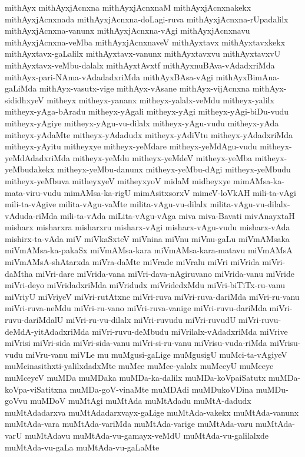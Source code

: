 {mithAyx
mithAyxjAcnxna
mithAyxjAcnxnaM
mithAyxjAcnxnakekx
mithAyxjAcnxnada
mithAyxjAcnxna-doLagi-ruva
mithAyxjAcnxna-rUpadalilx
mithAyxjAcnxna-vanunx
mithAyxjAcnxna-vAgi
mithAyxjAcnxnavu
mithAyxjAcnxna-veMba
mithAyxjAcnxnaveV
mithAyxtavx
mithAyxtavxkekx
mithAyxtavx-gaLalilx
mithAyxtavx-vanunx
mithAyxtavxvu
mithAyxtavxvU
mithAyxtavx-veMbu-dalalx
mithAyxtAvxtf
mithAyxnuBAva-vAdadxriMda
mithAyx-pari-NAma-vAdadadxriMda
mithAyxBAsa-vAgi
mithAyxBimAna-gaLiMda
mithAyx-vasutx-vige
mithAyx-vAsane
mithAyx-vijAcnxna
mithAyx-sididhxyeV
mitheyx
mitheyx-yananx
mitheyx-yalalx-veMdu
mitheyx-yalilx
mitheyx-yAga-bAradu
mitheyx-yAgali
mitheyx-yAgi
mitheyx-yAgi-biDu-vudu
mitheyx-yAgiye
mitheyx-yAgu-vu-dilalx
mitheyx-yAgu-vudu
mitheyx-yAda
mitheyx-yAdaMte
mitheyx-yAdadudx
mitheyx-yAdiVtu
mitheyx-yAdadxriMda
mitheyx-yAyitu
mitheyxye
mitheyx-yeMdare
mitheyx-yeMdAgu-vudu
mitheyx-yeMdAdadxriMda
mitheyx-yeMdu
mitheyx-yeMdeV
mitheyx-yeMba
mitheyx-yeMbudakekx
mitheyx-yeMbu-danunx
mitheyx-yeMbu-dAgi
mitheyx-yeMbudu
mitheyx-yeMbuva
mitheyxyeV
mitheyxyoV
midaM
midheyxye
mimAMsa-ka-mata-viru-vudu
mimAMsa-ka-rigU
mimAsitxsorxV
mimeV-loVkAH
mili-ta-vAgi
mili-ta-vAgive
milita-vAgu-vaMte
milita-vAgu-vu-dilalx
milita-vAgu-vu-dilalx-vAduda-riMda
mili-ta-vAda
miLita-vAgu-vAga
miva
miva-Bavati
mivAnayxtaH
misharx
misharxra
misharxru
misharx-vAgi
misharx-vAgu-vudu
misharx-vAda
mishirx-ta-vAda
miV
miVkaSxteV
miVnina
miVnu
miVnu-gaLu
miVmAMsaka
miVmAMsa-ka-pakaSx
miVmAMsa-kara
miVmAMsa-kara-matavu
miVmAMsA
miVmAMsA-shAtarxda
miVra-daMte
miVrade
miVralu
miVri
miVrida
miVri-daMtha
miVri-dare
miVrida-vana
miVri-dava-nAgiruvano
miVrida-vanu
miVride
miVri-deyo
miVridadxriMda
miVridudx
miVridedxMdu
miVri-biTiTx-ru-vanu
miVriyU
miVriyeV
miVri-rutAtxne
miVri-ruva
miVri-ruva-dariMda
miVri-ru-vanu
miVri-ruva-neMdu
miVri-ru-vano
miVri-ruva-vanige
miVri-ruvu-dariMda
miVri-ruvu-dariMdalU
miVri-ru-vu-dilalx
miVri-ruvudu
miVri-ruvudU
miVri-ruvu-deMdA-yitAdadxriMda
miVri-ruvu-deMbudu
miVrilalx-vAdadxriMda
miVrive
miVrisi
miVri-sida
miVri-sida-vanu
miVri-si-ru-vanu
miVrisu-vuda-riMda
miVrisu-vudu
miVru-vanu
miVLe
mu
muMgusi-gaLige
muMgusigU
muMci-ta-vAgiyeV
muMcinasithxti-yalilxdadxMte
muMce
muMce-yalalx
muMceyU
muMceye
muMceyeV
muMDa
muMDaka
muMDa-ka-dalilx
muMDa-koVpaiSatutx
muMDa-koVpa-viSatitxna
muMDa-goV-vinaMte
muMDAdi
muMDukoVDina
muMDu-goVvu
muMDoV
muMtAgi
muMtAda
muMtAdadu
muMtA-dadudx
muMtAdadarxva
muMtAdadarxvayx-gaLige
muMtAda-vakekx
muMtAda-vanunx
muMtAda-vara
muMtAda-variMda
muMtAda-varige
muMtAda-varu
muMtAda-varU
muMtAdavu
muMtAda-vu-gamayx-veMdU
muMtAda-vu-galilalxde
muMtAda-vu-gaLa
muMtAda-vu-gaLaMte
}
